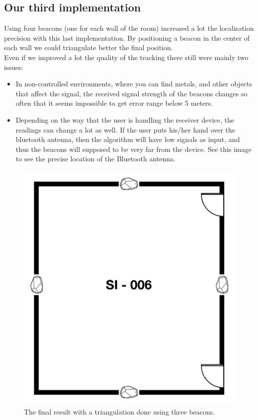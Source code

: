 \subsection{Our third implementation}
Using four beacons (one for each wall of the room) increased a lot the localisation precision with this last implementation. By positioning a beacon in the center of each wall we could triangulate better the final position.\\

Even if we improved a lot the quality of the tracking there still were mainly two issues:

\begin{itemize}
\item In non-controlled environments, where you can find metals, and other objects that affect the signal, the received signal strength of the beacons changes so often that it seems impossible to get error range below 5 meters.
\item Depending on the way that the user is handling the receiver device, the readings can change a lot as well. If the user puts his/her hand over the bluetooth antenna, then the algorithm will have low signals as input, and thus the beacons will supposed to be very far from the device. See this image to see the precise location of the Bluetooth antenna.
\end{itemize}

\begin{figure}[htbp]
\begin{center}
\includegraphics[scale=0.5]{img/room_beacon.png}
\caption{The final result with a triangulation done using three beacons.}
\label{room_beacon}
\end{center}
\end{figure}

